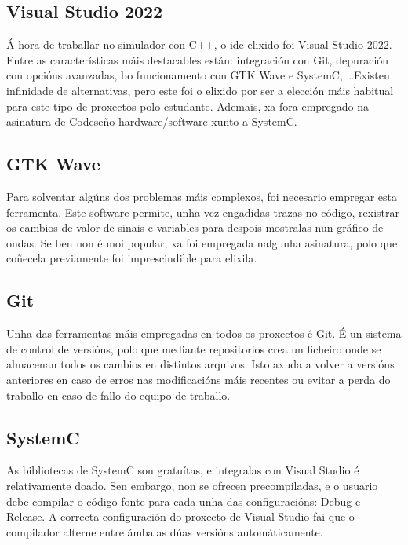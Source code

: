 \subsection{Visual Studio 2022}\label{sec:visual_studio}
Á hora de traballar no simulador con C++, o \acrshort{ide} elixido foi Visual Studio 2022. Entre as características máis destacables están: integración con Git, depuración con opcións avanzadas, bo funcionamento con GTK Wave e SystemC, \dots  Existen infinidade de alternativas, pero este foi o elixido por ser a elección máis habitual para este tipo de proxectos polo estudante. Ademais, xa fora empregado na asinatura de Codeseño \gls{hardware}/\gls{software} xunto a SystemC. 

\subsection{GTK Wave}\label{sec:gtkwave}
Para solventar algúns dos problemas máis complexos, foi necesario empregar esta ferramenta. Este software permite, unha vez engadidas trazas no código, rexistrar os cambios de valor de sinais e variables para despois mostralas nun gráfico de ondas. Se ben non é moi popular, xa foi empregada nalgunha asinatura, polo que  coñecela previamente foi imprescindible para elixila.

\subsection{Git}\label{sec:git}
Unha das ferramentas máis empregadas en todos os proxectos é Git. É un sistema de control de versións, polo que mediante repositorios crea un ficheiro onde se almacenan todos os cambios en distintos arquivos. Isto axuda a volver a versións anteriores en caso de erros nas modificacións máis recentes ou evitar a perda do traballo en caso de fallo do equipo de traballo.


\subsection{SystemC}\label{sec:imp_systemC}
As bibliotecas de SystemC son gratuítas, e integralas con Visual Studio é relativamente doado. Sen embargo, non se ofrecen precompiladas, e o usuario debe compilar o código fonte para cada unha das configuracións: Debug e Release. A correcta configuración do proxecto de Visual Studio fai que o compilador alterne entre ámbalas dúas versións automáticamente.



